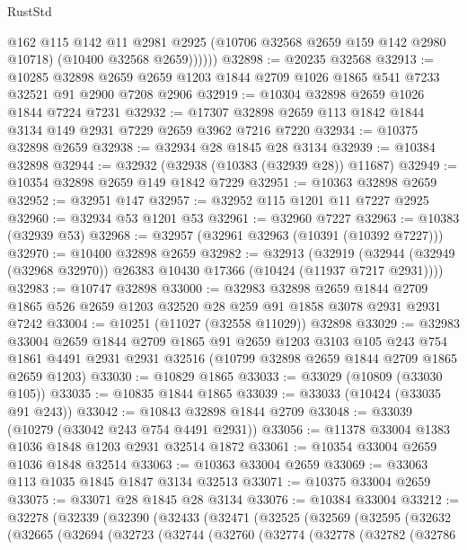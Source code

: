 \begin{lexlean}{RustStd}
\begin{coremodule}
              @162
              @115
              @142
              @11
              @2981
              @2925
              (@10706 @32568 @2659 @159 @142 @2980 @10718)
              (@10400 @32568 @2659))))))
@32898 := @20235 @32568
@32913 := @10285
    @32898
    @2659
    @2659
    @1203
    @1844
    @2709
    @1026
    @1865
    @541
    @7233
    @32521
    @91
    @2900
    @7208
    @2906
@32919 := @10304 @32898 @2659 @1026 @1844 @7224 @7231
@32932 := @17307 @32898 @2659 @113 @1842 @1844 @3134 @149 @2931 @7229 @2659 @3962 @7216 @7220
@32934 := @10375 @32898 @2659
@32938 := @32934 @28 @1845 @28 @3134
@32939 := @10384 @32898
@32944 := @32932 (@32938 (@10383 (@32939 @28)) @11687)
@32949 := @10354 @32898 @2659 @149 @1842 @7229
@32951 := @10363 @32898 @2659
@32952 := @32951 @147
@32957 := @32952 @115 @1201 @11 @7227 @2925
@32960 := @32934 @53 @1201 @53
@32961 := @32960 @7227
@32963 := @10383 (@32939 @53)
@32968 := @32957 (@32961 @32963 (@10391 (@10392 @7227)))
@32970 := @10400 @32898 @2659
@32982 := @32913
    (@32919 (@32944 (@32949 (@32968 @32970)) @26383 @10430 @17366 (@10424 (@11937 @7217 @2931))))
@32983 := @10747 @32898
@33000 := @32983
    @32898
    @2659
    @1844
    @2709
    @1865
    @526
    @2659
    @1203
    @32520
    @28
    @259
    @91
    @1858
    @3078
    @2931
    @2931
    @7242
@33004 := @10251 (@11027 (@32558 @11029)) @32898
@33029 := @32983
    @33004
    @2659
    @1844
    @2709
    @1865
    @91
    @2659
    @1203
    @3103
    @105
    @243
    @754
    @1861
    @4491
    @2931
    @2931
    @32516
    (@10799 @32898 @2659 @1844 @2709 @1865 @2659 @1203)
@33030 := @10829 @1865
@33033 := @33029 (@10809 (@33030 @105))
@33035 := @10835 @1844 @1865
@33039 := @33033 (@10424 (@33035 @91 @243))
@33042 := @10843 @32898 @1844 @2709
@33048 := @33039 (@10279 (@33042 @243 @754 @4491 @2931))
@33056 := @11378 @33004 @1383 @1036 @1848 @1203 @2931 @32514 @1872
@33061 := @10354 @33004 @2659 @1036 @1848 @32514
@33063 := @10363 @33004 @2659
@33069 := @33063 @113 @1035 @1845 @1847 @3134 @32513
@33071 := @10375 @33004 @2659
@33075 := @33071 @28 @1845 @28 @3134
@33076 := @10384 @33004
@33212 := @32278
    (@32339
      (@32390
        (@32433
          (@32471
            (@32525
              (@32569
                (@32595
                  (@32632
                    (@32665
                      (@32694
                        (@32723
                          (@32744
                            (@32760
                              (@32774
                                (@32778
                                  (@32782
                                    (@32786

\end{coremodule}
\end{lexlean}
